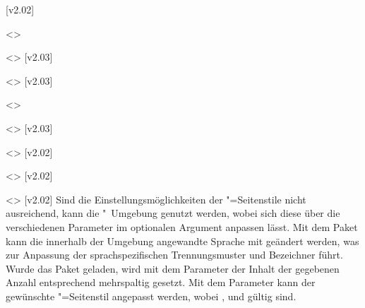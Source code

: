 \begin{DeclareEntity*}{}
\begin{DeclareEntity*}{}
\begin{DeclareEntity*}{}
\begin{Declaration}
  {}
\begin{Declaration}
  {}
\begin{Declaration}
  {}
\begin{Declaration}
  {}
  [v2.02]
\begin{Declaration}
  {}
  <>
\begin{Declaration}
  {}
  <>
  [v2.03]
\begin{Declaration}
  {}
  <>
  [v2.03]
\begin{Declaration}
  {}
  <>
\begin{Declaration}
  {}
  <>
  [v2.03]
\begin{Declaration}
  {}
  <>
  [v2.02]
\begin{Declaration}
  {}
  <>
  [v2.02]
\begin{Declaration}
  {}
  <>
  [v2.02]
Sind die Einstellungsmöglichkeiten der "=Seitenstile 
nicht ausreichend, kann die "~Umgebung genutzt werden, 
wobei sich diese über die verschiedenen Parameter im optionalen Argument 
anpassen lässt. Mit dem Paket  kann die innerhalb der Umgebung 
angewandte Sprache mit  geändert 
werden, was zur Anpassung der sprachspezifischen Trennungsmuster und Bezeichner 
führt. Wurde das Paket  geladen, wird mit dem Parameter 
 der Inhalt der gegebenen Anzahl 
entsprechend mehrspaltig gesetzt. Mit dem Parameter 
 kann der gewünschte  
"=Seitenstil angepasst werden, wobei , 
 und  gültig sind. 


\end{Declaration}
\end{Declaration}
\end{Declaration}
\end{Declaration}
\end{Declaration}
\end{Declaration}
\end{Declaration}
\end{Declaration}
\end{Declaration}
\end{Declaration}
\end{Declaration}
\end{Declaration}
\end{DeclareEntity*}
\end{DeclareEntity*}
\end{DeclareEntity*}
